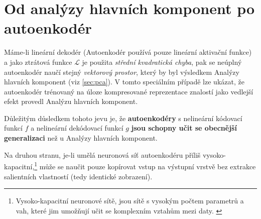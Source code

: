 \section{Od analýzy hlavních komponent po autoenkodér}
Máme-li lineární dekodér (Autoenkodér používá pouze lineární aktivační funkce) a jako ztrátová funkce $\mathcal{L}$ je použita \emph{střední kvadratická chyba},
pak se neúplný autoenkodér naučí stejný \emph{vektorový prostor}, který by byl výsledkem Analýzy hlavních komponent (viz \autoref{sec:pca}).
V tomto speciálním případě lze ukázat, že autoenkodér trénovaný na úloze kompresované reprezentace znalostí jako vedlejší efekt provedl Analýzu hlavních komponent. \cite{Baldi1989, Kamyshanska2013}

Důležitým důsledkem tohoto jevu je, že \textbf{autoenkodéry} s nelineární kódovací funkcí $f$
a nelineární dekódovací funkcí $g$ \textbf{jsou schopny učit se obecnější generalizaci}
než u Analýzy hlavních komponent. \cite{Goodfellow2016}

Na druhou stranu, je-li umělá neuronová síť autoenkodéru příliš vysoko-kapacitní,\footnote{Vysoko-kapacitní neuronové sítě, jsou sítě s vysokým počtem parametrů a vah, které jim umožňují učit se komplexním vztahům mezi daty. \cite[Kapitola 5]{Goodfellow2016}}
může se naučit pouze kopírovat vstup na výstupní vrstvě bez extrakce salientních vlastností (tedy identické zobrazení).